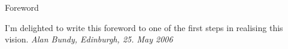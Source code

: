 \begin{omgroup}{Foreword}
\begin{omtext}
I'm delighted to write this foreword to one of the first steps in realising this vision.
\hfill {\emph{Alan Bundy, Edinburgh, 25. May 2006}}
\end{omtext}
\end{omgroup}

